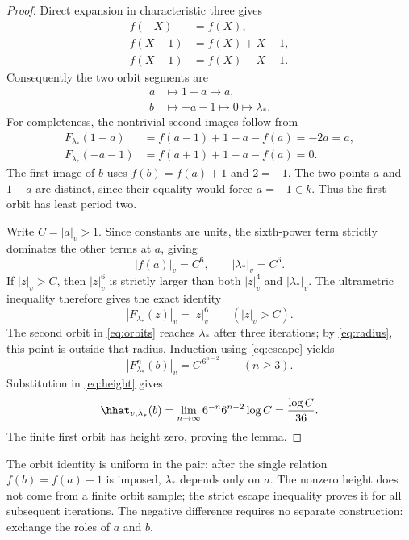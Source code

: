 \begin{proof}
Direct expansion in characteristic three gives
\begin{equation}\label{eq:translations}
 \begin{aligned}
 f(-X)&=f(X),\\
 f(X+1)&=f(X)+X-1,\\
 f(X-1)&=f(X)-X-1.
 \end{aligned}
\end{equation}
Consequently the two orbit segments are
\begin{equation}\label{eq:orbits}
 \begin{aligned}
 a&\longmapsto 1-a\longmapsto a,\\
 b&\longmapsto -a-1\longmapsto0\longmapsto\lambda_* .
 \end{aligned}
\end{equation}
For completeness, the nontrivial second images follow from
\[
 \begin{aligned}
 F_{\lambda_*}(1-a)
  &=f(a-1)+1-a-f(a)=-2a=a,\\
 F_{\lambda_*}(-a-1)
  &=f(a+1)+1-a-f(a)=0.
 \end{aligned}
\]
The first image of $b$ uses $f(b)=f(a)+1$ and $2=-1$.
The two points $a$ and $1-a$ are distinct, since their equality
would force $a=-1\in k$. Thus the first orbit has least period two.

Write $C=|a|_v>1$. Since constants are units, the sixth-power
term strictly dominates the other terms at $a$, giving
\begin{equation}\label{eq:radius}
 |f(a)|_v=C^6,\qquad |\lambda_*|_v=C^6.
\end{equation}
If $|z|_v>C$, then $|z|_v^6$ is strictly larger than both
$|z|_v^4$ and $|\lambda_*|_v$. The ultrametric inequality therefore
gives the exact identity
\begin{equation}\label{eq:escape}
 |F_{\lambda_*}(z)|_v=|z|_v^6\qquad(|z|_v>C).
\end{equation}
The second orbit in \eqref{eq:orbits} reaches $\lambda_*$ after
three iterations; by \eqref{eq:radius}, this point is outside that
radius. Induction using \eqref{eq:escape} yields
\[
 |F_{\lambda_*}^n(b)|_v=C^{\,6^{n-2}}\qquad(n\ge3).
\]
Substitution in \eqref{eq:height} gives
\[
 \hhat_{v,\lambda_*}(b)
   =\lim_{n\to\infty}6^{-n}6^{n-2}\log C
   =\frac{\log C}{36}.
\]
The finite first orbit has height zero, proving the lemma.
\end{proof}

\begin{remark}
The orbit identity is uniform in the pair: after the single relation
$f(b)=f(a)+1$ is imposed, $\lambda_*$ depends only on $a$.
The nonzero height does not come from a finite orbit sample; the
strict escape inequality proves it for all subsequent iterations.
The negative difference requires no separate construction: exchange
the roles of $a$ and $b$.
\end{remark}
